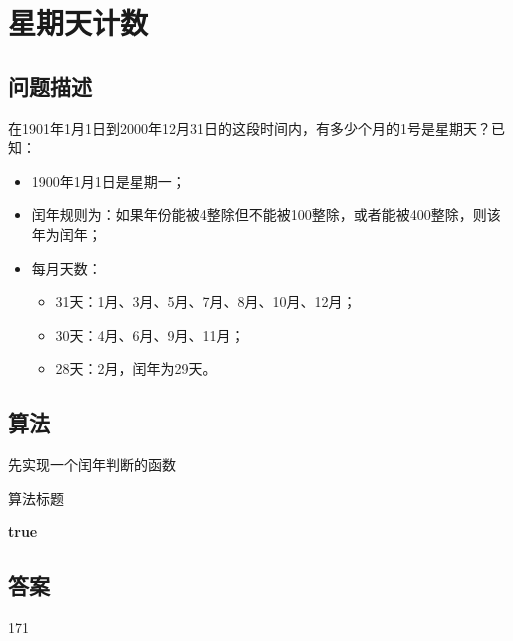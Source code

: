 \section{星期天计数}\label{sec:problem19}
\subsection{问题描述}
\begin{tcolorbox}
在1901年1月1日到2000年12月31日的这段时间内，有多少个月的1号是星期天？已知：
\begin{itemize}
    \item 1900年1月1日是星期一；
    \item 闰年规则为：如果年份能被4整除但不能被100整除，或者能被400整除，则该年为闰年；
    \item 每月天数：
    \begin{itemize}
        \item 31天：1月、3月、5月、7月、8月、10月、12月；
        \item 30天：4月、6月、9月、11月；
        \item 28天：2月，闰年为29天。
    \end{itemize}
\end{itemize}
\end{tcolorbox}

\subsection{算法}
先实现一个闰年判断的函数
\begin{algorithm}
	\caption{算法标题}
	\begin{algorithmic}[1]
		\Return \textbf{true}
	\EndIf
	\end{algorithmic}
\end{algorithm}

\subsection{答案}
171
